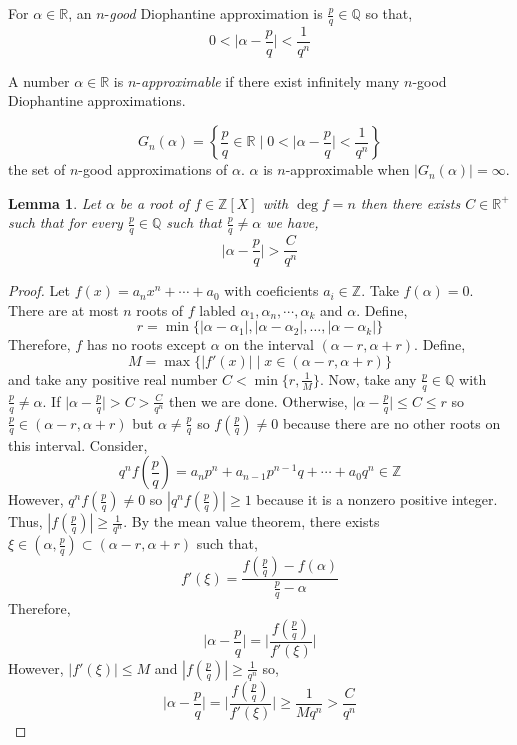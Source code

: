 \documentclass{article}
\newcommand{\Z}{\mathbb{Z}}
\newcommand{\Q}{\mathbb{Q}}
\newcommand{\R}{\mathbb{R}}
\newcommand{\Rplus}{\mathbb{R}^+}
\newenvironment{definition}[1][Definition:]{\begin{trivlist}
\item[\hskip \labelsep {\bfseries #1}]}{\end{trivlist}}
\theoremstyle{theorem}
\newtheorem{lemma}[theorem]{Lemma}
\theoremstyle{definition}
\theoremstyle{definition}
\theoremstyle{remark}
\theoremstyle{definition}
\theoremstyle{remark}
\begin{document}
\begin{definition}
For $\alpha \in \R$, an $n$-\textit{good} Diophantine approximation is $\frac{p}{q} \in \Q$ so that, 
\[ 0 < \Big| \alpha - \frac{p}{q} \Big| < \frac{1}{q^n}\]
\end{definition}

\begin{definition}
A number $\alpha \in \R$ is $n$-\textit{approximable} if there exist infinitely many $n$-good Diophantine approximations.  
\end{definition}

\begin{definition}
\[G_n(\alpha) = \left\{ \frac{p}{q} \in \R \mid 0 < \Big|\alpha - \frac{p}{q} \Big| < \frac{1}{q^n} \right\}\]
the set of $n$-good approximations of $\alpha$. $\alpha$ is $n$-approximable when $|G_n(\alpha)| = \infty$.
\end{definition}

\begin{lemma}
Let $\alpha$ be a root of $f \in \Z[X]$ with $\deg{f} = n$ then there exists $C \in \Rplus$ such that for every $\frac{p}{q} \in \Q$ such that $\frac{p}{q} \neq \alpha$ we have,
\[ \Big| \alpha - \frac{p}{q} \Big| > \frac{C}{q^n}\]
\end{lemma}

\begin{proof}
Let $f(x) = a_n x^n + \cdots + a_0$ with coeficients $a_i \in \Z$. Take $f(\alpha) = 0$. There are at most $n$ roots of $f$ labled $\alpha_1, \alpha_n, \cdots, \alpha_k$ and $\alpha$. Define, 
\[r = \min\{|\alpha - \alpha_1|, |\alpha - \alpha_2|, \dots, |\alpha - \alpha_k|\}\]
Therefore, $f$ has no roots except $\alpha$ on the interval $(\alpha - r, \alpha + r)$. Define, 
\[ M = \max \{ |f'(x)| \mid x \in (\alpha - r, \alpha + r) \}\]
and take any positive real number $C < \min\{r, \frac{1}{M}\}$. 
Now, take any $\frac{p}{q} \in \Q$ with $\frac{p}{q} \neq \alpha$. If $\Big| \alpha - \frac{p}{q} \Big| > C > \frac{C}{q^n}$ then we are done. Otherwise, $\Big| \alpha - \frac{p}{q} \Big| \le C \le r$ so $\frac{p}{q} \in (\alpha - r, \alpha + r)$ but $\alpha \neq \frac{p}{q}$ so $f(\frac{p}{q}) \neq 0$ because there are no other roots on this interval. Consider,
\[q^n f\left(\frac{p}{q}\right) = a_n p^n + a_{n-1} p^{n-1}q + \cdots + a_0 q^n \in \Z\]
However, $q^n f(\frac{p}{q}) \neq 0$ so $|q^n f(\frac{p}{q})| \ge 1$ because it is a nonzero positive integer. Thus, $|f(\frac{p}{q})| \ge \frac{1}{q^n}$. By the mean value theorem, there exists $\xi \in (\alpha, \frac{p}{q}) \subset (\alpha - r, \alpha + r)$ such that, \[f'(\xi) = \frac{f(\frac{p}{q}) - f(\alpha)}{\frac{p}{q} - \alpha}\]
Therefore, 
\[\Big| \alpha - \frac{p}{q} \Big| = \Bigg| \frac{f(\frac{p}{q})}{f'(\xi)} \Bigg| \] 
However, $|f'(\xi)| \le M$ and $|f(\frac{p}{q})| \ge \frac{1}{q^n}$ so,
\[\Big| \alpha - \frac{p}{q} \Big| = \Bigg| \frac{f(\frac{p}{q})}{f'(\xi)} \Bigg| \ge \frac{1}{M q^n} > \frac{C}{q^n} \] 
\end{proof}
\end{document}
